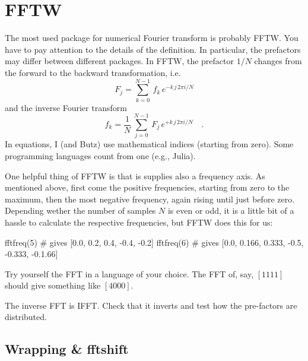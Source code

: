 

\section{FFTW}

The most used package for numerical Fourier transform is probably FFTW. You have to pay attention to the details of the definition. In particular, the prefactors may differ between different packages. In FFTW, the prefactor $1/N$ changes from the forward to the backward transformation, i.e.
%
\begin{equation}
 F_j =   \sum_{k=0}^{N-1} \, f_k \, e^{- k \, j \, 2 \pi i / N } 
\end{equation}
%
and the inverse Fourier transform
%
\begin{equation}
f_k =  \frac{1}{N} \, \sum_{j=0}^{N-1} \, F_j \, e^{+ k \,  j \, 2 \pi i / N } \quad .
\end{equation}
In equations, I (and Butz) use mathematical indices (starting from zero).
Some programming languages count from one (e.g., Julia).

One helpful thing of FFTW is that is supplies also a frequency axis. As mentioned above, first come the positive frequencies, starting from zero to the maximum, then the most negative frequency, again rising until just before zero. 
Depending wether the number of samples $N$ is  even or odd, it is a little bit of a hassle 
to calculate the respective frequencies, but FFTW   does this for us:
\begin{jllisting}
  fftfreq(5) # gives [0.0, 0.2, 0.4, -0.4, -0.2]
  fftfreq(6) # gives [0.0, 0.166, 0.333, -0.5, -0.333, -0.1.66]
\end{jllisting}

\begin{questions}
  \item Try yourself the FFT in a language of your choice. The FFT of, say, $[1 1 1 1]$ should give something like $[4 0 0 0 ]$. 
  \item The inverse FFT is IFFT. Check that it inverts and test how the pre-factors are distributed.
\end{questions}



\subsection{Wrapping \& fftshift}

